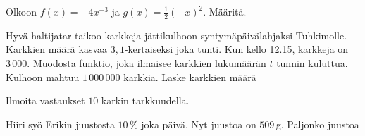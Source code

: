 \begin{tehtava}
	Olkoon $f(x)=-4x^{-3}$ ja $g(x)=\frac{1}{2}(-x)^{2}$. Määritä.
	
	
\begin{vastaus}
\end{vastaus}
\end{tehtava}
	
	\begin{tehtava}
	Hyvä haltijatar taikoo karkkeja jättikulhoon syntymäpäivälahjaksi Tuhkimolle. Karkkien määrä kasvaa $3,1$-kertaiseksi joka tunti. Kun kello 12.15, karkkeja on $3\,000$. Muodosta funktio, joka ilmaisee karkkien lukumäärän $t$ tunnin kuluttua. Kulhoon mahtuu $1\,000\,000$ karkkia. Laske karkkien määrä
	
	Ilmoita vastaukset $10$ karkin tarkkuudella.

\begin{vastaus}
\end{vastaus}
\end{tehtava}

\begin{tehtava}
	Hiiri syö Erikin juustosta $10\,\%$ joka päivä. Nyt juustoa on $509$\,g. Paljonko juustoa
	
\begin{vastaus}
\end{vastaus}
\end{tehtava}

\newpage